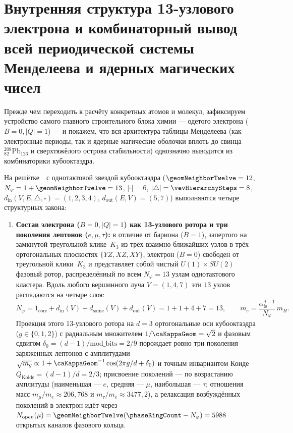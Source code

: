 \section{Внутренняя структура 13-узлового электрона и комбинаторный вывод всей периодической системы Менделеева и ядерных магических чисел}
\label{sec:chem-electron-and-periodic-table}

Прежде чем переходить к расчёту конкретных атомов и молекул, зафиксируем устройство самого главного строительного блока химии — одетого электрона ($B=0, |Q|=1$) — и покажем, что вся архитектура таблицы Менделеева (как электронные периоды, так и ядерные магические оболочки вплоть до свинца $^{208}_{82}\text{Pb}_{126}$ и сверхтяжёлого острова стабильности) однозначно выводится из комбинаторики кубооктаэдра.

\begin{theorem}
\label{thm:chem-electron-and-periodic-table}
На решётке~\latGCKshort\ с однотактовой звездой кубооктаэдра ($\geomNeighborTwelve = 12$, $N_\varphi = 1 + \geomNeighborTwelve = 13$, $|\square| = 6$, $|\triangle| = \vevHierarchySteps = 8$, $d_{\mathrm{in}}(V,E,\triangle,\square) = (1,2,3,4)$, $d_{\mathrm{out}}(E,V) = (5,7)$) выполняются четыре структурных закона:
\begin{enumerate}[leftmargin=*]
\item \textbf{Состав электрона ($B=0, |Q|=1$) как 13-узлового ротора и три поколения лептонов ($e,\mu,\tau$):}
  в отличие от бариона ($B=1$), запертого на замкнутой треугольной клике~$K_3$ из трёх взаимно ближайших узлов в трёх ортогональных плоскостях $\{YZ,XZ,XY\}$, электрон ($B=0$) свободен от треугольной клики~$K_3$ и представляет собой чистый $U(1)\times SU(2)$ фазовый ротор, распределённый по всем $N_\varphi = 13$ узлам однотактового кластера.
  Вдоль любого вершинного луча $V=(1,4,7)$ эти $13$ узлов распадаются на четыре слоя:
  \begin{equation}
  \label{eq:chem-electron-13node-partition}
    N_\varphi
    = 1_{\mathrm{core}} + d_{\mathrm{in}}(V) + d_{\mathrm{same}}(V) + d_{\mathrm{out}}(V)
    = 1 + 1 + 4 + 7 = 13,
    \qquad
    m_e = \frac{\alpha_{\mathrm{fs}}^{d-1}}{N_\varphi}\,m_H.
  \end{equation}
  Проекция этого 13-узлового ротора на $d = 3$ ортогональные оси кубооктаэдра ($g\in\{0,1,2\}$) с радиальным множителем $1/\caKappaGeom = \sqrt{2}$ и фазовым сдвигом $\delta_0 = (d-1)/\mathrm{mod\_bits} = 2/9$ порождает ровно три поколения заряженных лептонов с амплитудами $\sqrt{m_g}\propto 1 + \caKappaGeom^{-1}\cos(2\pi g/d + \delta_0)$ и точным инвариантом Коиде $Q_{\mathrm{Koide}} = (d-1)/d = 2/3$; присвоение поколений --- по возрастанию амплитуды (наименьшая --- $e$, средняя --- $\mu$, наибольшая --- $\tau$; отношения масс $m_\mu/m_e \approx 206{,}768$ и $m_\tau/m_e \approx 3477{,}2$), а релаксация возбуждённых поколений в электрон идёт через $N_{\mathrm{open}}(\mu) = \geomNeighborTwelve(\phaseRingCount - N_\varphi) = 5988$ открытых каналов фазового кольца.

\end{enumerate}
\end{theorem}
